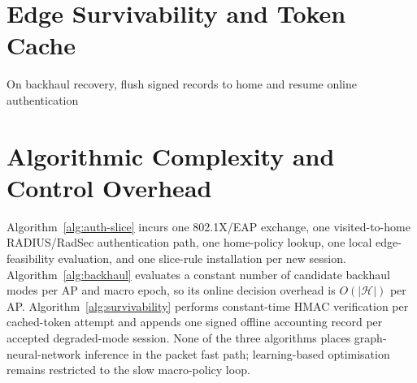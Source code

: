 \section{Edge Survivability and Token Cache}
\label{sec:alg-surv}

\begin{algorithm}[H]
  \caption{Cached Token Verification and Offline Accounting}
  \label{alg:survivability}
  On backhaul recovery, flush signed records to home \radius{} and resume online authentication\;
\end{algorithm}


\section{Algorithmic Complexity and Control Overhead}
\label{sec:algorithmic-overhead}

Algorithm~\ref{alg:auth-slice} incurs one 802.1X/EAP exchange, one visited-to-home
RADIUS/RadSec authentication path, one home-policy lookup, one local edge-feasibility
evaluation, and one slice-rule installation per new session. Algorithm~\ref{alg:backhaul}
evaluates a constant number of candidate backhaul modes per AP and macro epoch, so
its online decision overhead is $O(|\mathcal{H}|)$ per AP. Algorithm~\ref{alg:survivability}
performs constant-time HMAC verification per cached-token attempt and appends one
signed offline accounting record per accepted degraded-mode session. None of the three
algorithms places graph-neural-network inference in the packet fast path; learning-based
optimisation remains restricted to the slow macro-policy loop.

